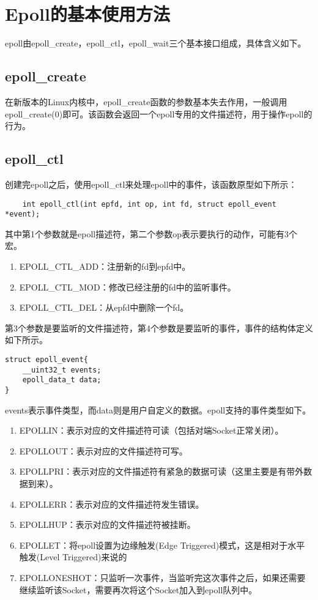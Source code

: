 \documentclass[bachelor]{thesis-uestc}
\begin{document}
\section{Epoll的基本使用方法}

epoll由epoll\_create，epoll\_ctl，epoll\_wait三个基本接口组成，具体含义如下。

\subsection{epoll\_create}
在新版本的Linux内核中，epoll\_create函数的参数基本失去作用，一般调用epoll\_create(0)即可。该函数会返回一个epoll专用的文件描述符，用于操作epoll的行为。
\subsection{epoll\_ctl}
创建完epoll之后，使用epoll\_ctl来处理epoll中的事件，该函数原型如下所示：
\begin{lstlisting}
	int epoll_ctl(int epfd, int op, int fd, struct epoll_event *event);
\end{lstlisting}

其中第1个参数就是epoll描述符，第二个参数op表示要执行的动作，可能有3个宏。
\begin{enumerate}
	\item EPOLL\_CTL\_ADD：注册新的fd到epfd中。
	\item EPOLL\_CTL\_MOD：修改已经注册的fd中的监听事件。
	\item EPOLL\_CTL\_DEL：从epfd中删除一个fd。
\end{enumerate}

第3个参数是要监听的文件描述符，第4个参数是要监听的事件，事件的结构体定义如下所示。

\begin{lstlisting}
struct epoll_event{
	__uint32_t events;
	epoll_data_t data;
}
\end{lstlisting}

events表示事件类型，而data则是用户自定义的数据。epoll支持的事件类型如下。
\begin{enumerate}
	\item EPOLLIN：表示对应的文件描述符可读（包括对端Socket正常关闭）。
	\item EPOLLOUT：表示对应的文件描述符可写。
	\item EPOLLPRI：表示对应的文件描述符有紧急的数据可读（这里主要是有带外数据到来）。
	\item EPOLLERR：表示对应的文件描述符发生错误。
	\item EPOLLHUP：表示对应的文件描述符被挂断。
	\item EPOLLET：将epoll设置为边缘触发(Edge Triggered)模式，这是相对于水平触发(Level Triggered)来说的
	\item EPOLLONESHOT：只监听一次事件，当监听完这次事件之后，如果还需要继续监听该Socket，需要再次将这个Socket加入到epoll队列中。
\end{enumerate}
\end{document}
